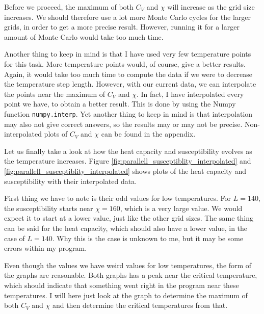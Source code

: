 \documentclass[12pt]{article}
\begin{document}
Before we proceed, the maximum of both $C_V$ and $\chi$ will increase as the grid size increases. We should therefore use a lot more Monte Carlo cycles for the larger grids, in order to get a more precise result. However, running it for a larger amount of Monte Carlo would take too much time.

Another thing to keep in mind is that I have used very few temperature points for this task. More temperature points would, of course, give a better results. Again, it would take too much time to compute the data if we were to decrease the temperature step length. However, with our current data, we can interpolate the points near the maximum of $C_V$ and $\chi$. In fact, I have interpolated every point we have, to obtain a better result. This is done by using the Numpy function \texttt{numpy.interp}. Yet another thing to keep in mind is that interpolation may also not give correct answers, so the results may or may not be precise. Non-interpolated plots of $C_V$ and $\chi$ can be found in the appendix.

Let us finally take a look at how the heat capacity and susceptibility evolves as the temperature increases. Figure \ref{fig:parallell_susceptiblity_interpolated} and \ref{fig:parallell_susceptiblity_interpolated} shows plots of the heat capacity and susceptibility with their interpolated data. 

First thing we have to note is their odd values for low temperatures. For $L=140$, the susceptibility  starts near $\chi = 160$, which is a very large value. We would expect it to start at a lower value, just like the other grid sizes. The same thing can be said for the heat capacity, which should also have a lower value, in the case of $L=140$. Why this is the case is unknown to me, but it may be some errors within my program.

Even though the values we have weird values for low temperatures, the form of the graphs are reasonable. Both graphs has a peak near the critical temperature, which should indicate that something went right in the program near these temperatures. I will here just look at the graph to determine the maximum of both $C_V$ and $\chi$ and then determine the critical temperatures from that.
\end{document}
